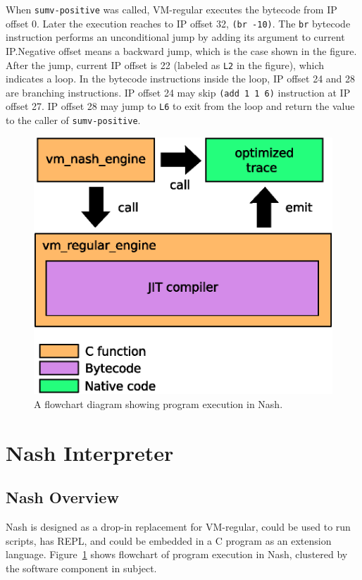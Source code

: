 \documentclass[preprint, 10pt]{sigplanconf}
\begin{document}
When \texttt{sumv-positive} was called, VM-regular executes the bytecode from
IP offset 0. Later the execution reaches to IP offset 32, \texttt{(br
  -10)}. The \texttt{br} bytecode instruction performs an unconditional jump
by adding its argument to current IP.\@ Negative offset means a backward jump,
which is the case shown in the figure. After the jump, current IP offset is 22
(labeled as \texttt{L2} in the figure), which indicates a loop. In the
bytecode instructions inside the loop, IP offset 24 and 28 are branching
instructions. IP offset 24 may skip \texttt{(add 1 1 6)} instruction at IP
offset 27. IP offset 28 may jump to \texttt{L6} to exit from the loop and
return the value to the caller of \texttt{sumv-positive}.

\begin{figure}
  \centering
  \includegraphics[width=0.45 \textwidth]{overview}
  \caption{A flowchart diagram showing program execution in Nash.}
\label{fig:overview}
\end{figure}

\section{Nash Interpreter}
\label{sec:interpreter}

\subsection{Nash Overview}
\label{sec:overview}

Nash is designed as a drop-in replacement for VM-regular, could be used to run
scripts, has REPL, and could be embedded in a C program as an extension
language. Figure~\hyperref[fig:overview]{\ref{fig:overview}} shows flowchart
of program execution in Nash, clustered by the software component in
subject.
\end{document}
